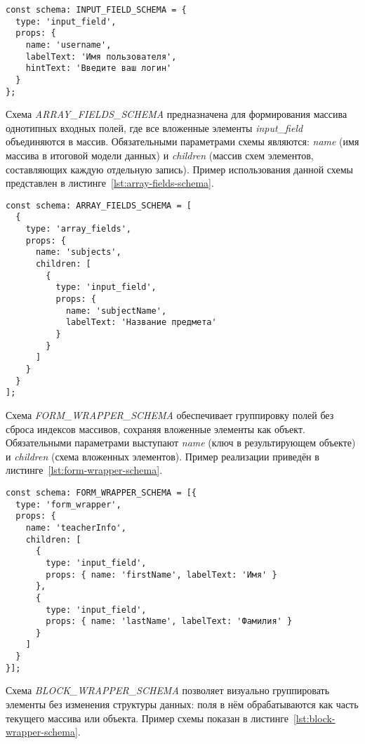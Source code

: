 \begin{lstlisting}[caption={Пример схемы INPUT\_FIELD\_SCHEMA},label={lst:input-fields-schema}]
const schema: INPUT_FIELD_SCHEMA = {
  type: 'input_field',
  props: {
    name: 'username',
    labelText: 'Имя пользователя',
    hintText: 'Введите ваш логин'
  }
};
\end{lstlisting}

Схема \textit{ARRAY\_FIELDS\_SCHEMA} предназначена для формирования массива однотипных входных полей, где все вложенные элементы \textit{input\_field} объединяются в массив. Обязательными параметрами схемы являются: \textit{name} (имя массива в итоговой модели данных) и \textit{children} (массив схем элементов, составляющих каждую отдельную запись). Пример использования данной схемы представлен в листинге~\ref{lst:array-fields-schema}.

\begin{lstlisting}[caption={Пример схемы \textit{ARRAY\_FIELDS\_SCHEMA}},label={lst:array-fields-schema}]
const schema: ARRAY_FIELDS_SCHEMA = [
  {
    type: 'array_fields',
    props: {
      name: 'subjects',
      children: [
        {
          type: 'input_field',
          props: {
            name: 'subjectName',
            labelText: 'Название предмета'
          }
        }
      ]
    }
  }
];
\end{lstlisting}

Схема \textit{FORM\_WRAPPER\_SCHEMA} обеспечивает группировку полей без сброса индексов массивов, сохраняя вложенные элементы как объект. Обязательными параметрами выступают \textit{name} (ключ в результирующем объекте) и \textit{children} (схема вложенных элементов). Пример реализации приведён в листинге~\ref{lst:form-wrapper-schema}.

\begin{lstlisting}[caption={Пример схемы \textit{FORM\_WRAPPER\_SCHEMA}},label={lst:form-wrapper-schema}]
const schema: FORM_WRAPPER_SCHEMA = [{
  type: 'form_wrapper',
  props: {
    name: 'teacherInfo',
    children: [
      {
        type: 'input_field',
        props: { name: 'firstName', labelText: 'Имя' }
      },
      {
        type: 'input_field',
        props: { name: 'lastName', labelText: 'Фамилия' }
      }
    ]
  }
}];
\end{lstlisting}

Схема \textit{BLOCK\_WRAPPER\_SCHEMA} позволяет визуально группировать элементы без изменения структуры данных: поля в нём обрабатываются как часть текущего массива или объекта. Пример схемы показан в листинге~\ref{lst:block-wrapper-schema}.

